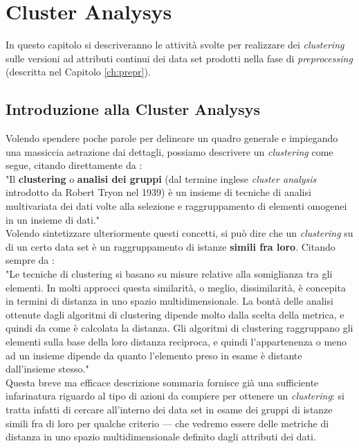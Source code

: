 \chapter{Cluster Analysys}
\label{ch:cluster}

    In questo capitolo si descriveranno le attività svolte per realizzare dei \textit{clustering} sulle versioni ad attributi continui dei data set prodotti nella fase di \textit{preprocessing} (descritta nel Capitolo \ref{ch:prepr}).

\section{Introduzione alla Cluster Analysys}

    Volendo spendere poche parole per delineare un quadro generale e impiegando una massiccia astrazione dai dettagli, possiamo descrivere un \textit{clustering} come segue, citando direttamente da \cite{clustering}:\\

    "Il \textbf{clustering} o \textbf{analisi dei gruppi} (dal termine inglese \textit{cluster analysis} introdotto da Robert Tryon nel 1939) è un insieme di tecniche di analisi multivariata dei dati volte alla selezione e raggruppamento di elementi omogenei in un insieme di dati."\\

    Volendo sintetizzare ulteriormente questi concetti, si può dire che un \textit{clustering} su di un certo data set è un raggruppamento di istanze \textbf{simili fra loro}. Citando sempre da \cite{clustering}:\\

    "Le tecniche di clustering si basano su misure relative alla somiglianza tra gli elementi. In molti approcci questa similarità, o meglio, dissimilarità, è concepita in termini di distanza in uno spazio multidimensionale. La bontà delle analisi ottenute dagli algoritmi di clustering dipende molto dalla scelta della metrica, e quindi da come è calcolata la distanza. Gli algoritmi di clustering raggruppano gli elementi sulla base della loro distanza reciproca, e quindi l'appartenenza o meno ad un insieme dipende da quanto l'elemento preso in esame è distante dall'insieme stesso."\\

    Questa breve ma efficace descrizione sommaria fornisce già una sufficiente infarinatura riguardo al tipo di azioni da compiere per ottenere un \textit{clustering}: si tratta infatti di cercare all'interno dei data set in esame dei gruppi di istanze simili fra di loro per qualche criterio --- che vedremo essere delle metriche di distanza in uno spazio multidimensionale definito dagli attributi dei dati.\\

